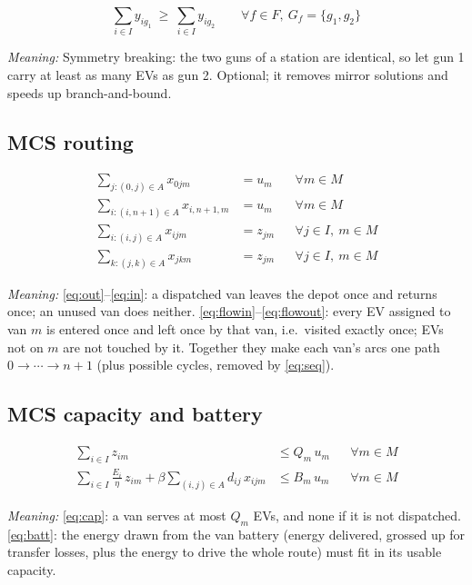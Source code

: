 \documentclass[12pt,a4paper]{article}
\newcommand{\mdesc}[1]{\par{\textit{Meaning:} #1}\par}
\begin{document}
\begin{equation}
\sum_{i\in I}y_{ig_1}\ \ge\ \sum_{i\in I}y_{ig_2}\qquad\forall f\in F,\ G_f=\{g_1,g_2\} \label{eq:gunsym}
\end{equation}
\mdesc{Symmetry breaking: the two guns of a station are identical, so let gun 1 carry at least as many EVs as gun 2. Optional; it removes mirror solutions and speeds up branch-and-bound.}

\subsection{MCS routing}
\begin{align}
\sum_{j:(0,j)\in A}x_{0jm} &= u_m && \forall m\in M \label{eq:out}\\
\sum_{i:(i,n+1)\in A}x_{i,n+1,m} &= u_m && \forall m\in M \label{eq:in}\\
\sum_{i:(i,j)\in A}x_{ijm} &= z_{jm} && \forall j\in I,\ m\in M \label{eq:flowin}\\
\sum_{k:(j,k)\in A}x_{jkm} &= z_{jm} && \forall j\in I,\ m\in M \label{eq:flowout}
\end{align}
\mdesc{\eqref{eq:out}--\eqref{eq:in}: a dispatched van leaves the depot once and returns once; an unused van does neither. \eqref{eq:flowin}--\eqref{eq:flowout}: every EV assigned to van $m$ is entered once and left once by that van, i.e.\ visited exactly once; EVs not on $m$ are not touched by it. Together they make each van's arcs one path $0\to\cdots\to n+1$ (plus possible cycles, removed by \eqref{eq:seq}).}

\subsection{MCS capacity and battery}
\begin{align}
\sum_{i\in I}z_{im} &\le Q_m\,u_m && \forall m\in M \label{eq:cap}\\
\sum_{i\in I}\frac{E_i}{\eta}\,z_{im}+\beta\sum_{(i,j)\in A}d_{ij}\,x_{ijm} &\le B_m\,u_m && \forall m\in M \label{eq:batt}
\end{align}
\mdesc{\eqref{eq:cap}: a van serves at most $Q_m$ EVs, and none if it is not dispatched. \eqref{eq:batt}: the energy drawn from the van battery (energy delivered, grossed up for transfer losses, plus the energy to drive the whole route) must fit in its usable capacity.}
\end{document}
